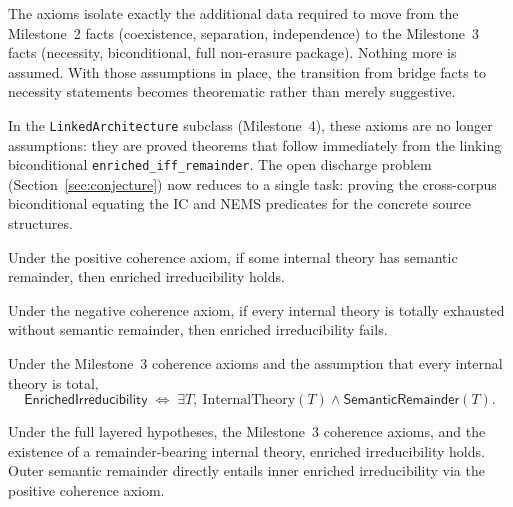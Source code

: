 \documentclass[11pt]{article}
\newcommand{\SemRem}{\ensuremath{\mathsf{SemanticRemainder}}}
\newcommand{\EnrIrr}{\ensuremath{\mathsf{EnrichedIrreducibility}}}
\begin{document}
The axioms isolate exactly the additional data required to move from the Milestone~2
facts (coexistence, separation, independence) to the Milestone~3 facts (necessity,
biconditional, full non-erasure package).  Nothing more is assumed.  With those
assumptions in place, the transition from bridge facts to necessity statements becomes
theorematic rather than merely suggestive.

In the \texttt{LinkedArchitecture} subclass (Milestone~4), these axioms are no longer
assumptions: they are proved theorems that follow immediately from the linking
biconditional \texttt{enriched\_iff\_remainder}.  The open discharge problem
(Section~\ref{sec:conjecture}) now reduces to a single task: proving the cross-corpus
biconditional equating the IC and NEMS predicates for the concrete source structures.

\begin{theorem}
\label{thm:pos-nonerasure}
Under the positive coherence axiom, if some internal theory has semantic remainder,
then enriched irreducibility holds.
\par{}
\end{theorem}

\begin{theorem}
\label{thm:neg-nonerasure}
Under the negative coherence axiom, if every internal theory is totally exhausted
without semantic remainder, then enriched irreducibility fails.
\par{}
\end{theorem}

\begin{theorem}
\label{thm:bic-nonerasure}
Under the Milestone~3 coherence axioms and the assumption that every internal theory
is total,
\[
\EnrIrr \;\Longleftrightarrow\; \exists T,\ \mathrm{InternalTheory}(T) \wedge \SemRem(T).
\]
\par{}
\end{theorem}

\begin{theorem}
\label{thm:nonerasure}
Under the full layered hypotheses, the Milestone~3 coherence axioms, and the existence
of a remainder-bearing internal theory, enriched irreducibility holds.  Outer semantic
remainder directly entails inner enriched irreducibility via the positive coherence axiom.
\par{}
\end{theorem}
\end{document}
